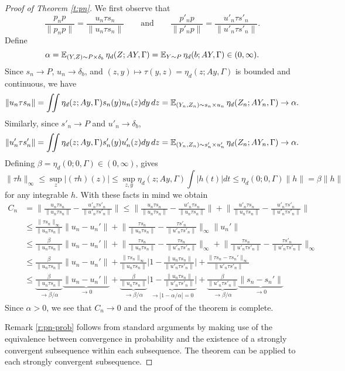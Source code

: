 \begin{proof}[Proof of Theorem \ref{t:pn}]
We first observe that
\[ \frac{p_np}{\|p_n p\|} = \frac{u_n \tau s_n}{\|u_n \tau s_n\|} \quad \quad \text{and} \quad \quad \frac{p'_np}{\|p'_n p\|} = \frac{u'_n \tau s'_n}{\|u'_n \tau s'_n\|} . \]
Define 
\[ \alpha=\operatorname{\mathbb{E}}_{(Y,Z)\sim P\times\delta_b} \eta_d(Z;AY,\Gamma) = \operatorname{\mathbb{E}}_{Y\sim P} \eta_d(b;AY,\Gamma)  \in(0,\infty) . \]
Since $s_n\to P$, $u_n\to\delta_b$, and $(z,y)\mapsto\tau(y,z) = \eta_d(z;Ay,\Gamma)$ is bounded and continuous, we have
\[ \|u_n\tau s_n\| = \iint \eta_d(z;Ay,\Gamma) s_n(y) u_n(z) dy \, dz = \operatorname{\mathbb{E}}_{(Y_n,Z_n)\sim s_n\times u_n} \eta_d(Z_n;AY_n,\Gamma) \to  \alpha . \]
Similarly, since $s'_n\to P$ and $u'_n\to\delta_b$,
\[ \|u'_n\tau s'_n\| = \iint \eta_d(z;Ay,\Gamma) s'_n(y) u'_n(z) dy \, dz = \operatorname{\mathbb{E}}_{(Y_n,Z_n)\sim s'_n\times u'_n} \eta_d(Z_n;AY_n,\Gamma) \to \alpha  . \]
Defining $\beta=\eta_d(0;0,\Gamma)\in(0,\infty)$, gives
\[ \|\tau h\|_\infty \leq \sup_z |(\tau h)(z)| \leq \sup_{z,y} \eta_d(z;Ay,\Gamma) \int |h(t)| dt \leq \eta_d(0;0,\Gamma)\|h\| = \beta\|h\| \]
for any integrable $h$. With these facts in mind we obtain
\[ \begin{aligned} C_n & =  \bigg\| \frac{u_n \tau s_n}{\|u_n \tau s_n\|} - \frac{u'_n \tau s'_n}{\|u'_n \tau s'_n\|} \bigg\| \leq \bigg\| \frac{u_n \tau s_n}{\|u_n \tau s_n\|} - \frac{u'_n \tau s_n}{\|u_n \tau s_n\|} \bigg\| + \bigg\| \frac{u'_n \tau s_n}{\|u_n \tau s_n\|} - \frac{u'_n \tau s'_n}{\|u'_n \tau s'_n\|} \bigg\|
\\ & \leq \frac{\|\tau s_n\|_\infty}{\|u_n \tau s_n\|}\|u_n-u_n'\| + \bigg\| \frac{\tau s_n}{\|u_n \tau s_n\|} - \frac{\tau s'_n}{\|u'_n \tau s'_n\|} \bigg\|_\infty \|u_n'\|
\\ & \leq \frac{\beta}{\|u_n \tau s_n\|}\|u_n-u_n'\| + \bigg\| \frac{\tau s_n}{\|u_n \tau s_n\|} - \frac{\tau s_n}{\|u'_n \tau s'_n\|} \bigg\|_\infty + \bigg\| \frac{\tau s_n}{\|u'_n \tau s'_n\|} - \frac{\tau s'_n}{\|u'_n \tau s'_n\|} \bigg\|_\infty 
\\ & \leq \frac{\beta}{\|u_n \tau s_n\|}\|u_n-u_n'\| + \frac{\|\tau s_n\|_\infty}{\|u_n \tau s_n\|}\bigg| 1 - \frac{\|u_n \tau s_n\|}{\|u'_n \tau s'_n\|} \bigg| +  \frac{\|\tau s_n-\tau s_n'\|_\infty}{\|u'_n \tau s'_n\|} 
\\ & \leq \underbrace{\frac{\beta}{\|u_n \tau s_n\|}}_{\to \beta/\alpha}\underbrace{\|u_n-u_n'\|}_{\to 0} + \underbrace{\frac{\beta}{\|u_n \tau s_n\|}}_{\to\beta/\alpha}\underbrace{\bigg| 1 - \frac{\|u_n \tau s_n\|}{\|u'_n \tau s'_n\|} \bigg|}_{\to|1-\alpha/\alpha|=0} +  \underbrace{\frac{\beta}{\|u'_n \tau s'_n\|}}_{\to\beta/\alpha} \underbrace{ \|s_n-s_n'\| }_{\to 0}
\end{aligned}
\]
Since $\alpha > 0$, we see that $C_n\to 0$ and the proof of the theorem is complete.

Remark \ref{r:pn-prob} follows from standard arguments by making use of the equivalence between convergence in probability and the existence of a strongly convergent subsequence within each subsequence. The theorem can be applied to each strongly convergent subsequence.
\end{proof}


